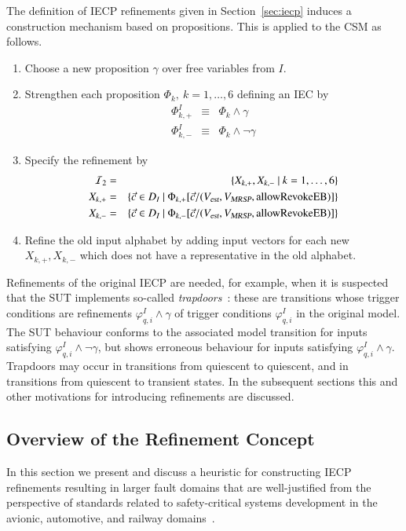 The definition of IECP refinements given in Section~\ref{sec:iecp} induces a construction 
mechanism based on propositions. This is applied to the CSM as follows.
\begin{enumerate}
\item Choose a new proposition $\gamma$ over free variables from $I$.
\item Strengthen each proposition $\Phi_k,\ k= 1,\dots,6$ defining an IEC   by
\begin{eqnarray*}
\Phi_{k,+}^I & \equiv & \Phi_k\wedge \gamma
\\
\Phi_{k,-}^I & \equiv & \Phi_k\wedge \neg\gamma
\end{eqnarray*}

\item Specify the refinement  by 
\begin{eqnarray*}
{\cal I}_2 & = & \{ X_{k,+},X_{k,-}~|~k = 1,\dots,6  \}
\\
X_{k,+} & = & \{\vec c\in D_I~|~\Phi_{k,+}[\vec c/({V_{\text{\sl est}}},{V_{\text{\sl MRSP}}},\text{allowRevokeEB})]\} 
\\
X_{k,-} & = & \{\vec c\in D_I~|~\Phi_{k,-}[\vec c/({V_{\text{\sl est}}},{V_{\text{\sl MRSP}}},\text{allowRevokeEB})]\} 
\end{eqnarray*}


\item Refine the old input alphabet by adding input vectors for each new $X_{k,+}, X_{k,-}$ which does not have a representative in the old alphabet.
\end{enumerate}


Refinements of the original IECP are needed, for example, when it is suspected that the SUT implements so-called {\it trapdoors}~\cite{libBinder2000}: these are transitions whose trigger conditions are refinements $\varphi_{q,i}^I\wedge \gamma$ of trigger conditions  $\varphi_{q,i}^I$ in the original model. The SUT behaviour conforms to the associated  model transition for inputs satisfying $\varphi_{q,i}^I\wedge \neg\gamma$, but shows erroneous behaviour for inputs satisfying  $\varphi_{q,i}^I\wedge \gamma$. Trapdoors may occur in transitions from quiescent to quiescent, and in transitions from quiescent to transient states. In the subsequent sections this and other motivations for introducing refinements are discussed.


\subsection{Overview of the Refinement Concept}
In this section we present and discuss a heuristic for constructing IECP refinements
resulting in larger fault domains that are well-justified from the perspective of 
standards related to safety-critical systems development in the avionic, automotive, and railway domains~\cite{do178b,DO178C,ISO26262-8,CENELEC50128}.



